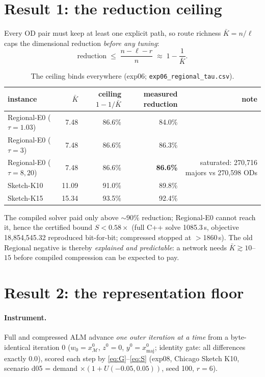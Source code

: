 \documentclass[11pt]{article}
\newcommand{\Kbar}{\bar K}
\begin{document}
\section{Result 1: the reduction ceiling}\label{sec:ceiling}

Every OD pair must keep at least one explicit path, so route richness
$\Kbar=n/\ell$ caps the dimensional reduction \emph{before any tuning}:
\begin{equation}
\text{reduction}\;\le\;\frac{n-\ell-r}{n}\;\approx\;1-\frac{1}{\Kbar}.
\label{eq:ceiling}
\end{equation}

\begin{table}[h]\centering\small
\caption{The ceiling binds everywhere (exp06; \texttt{exp06\_regional\_tau.csv}).}
\begin{tabular}{lrrrr}
\toprule
instance & $\Kbar$ & ceiling $1{-}1/\Kbar$ & measured reduction & note\\
\midrule
Regional-E0 ($\tau{=}1.03$) & 7.48 & 86.6\% & 84.0\% & \\
Regional-E0 ($\tau{=}3$)    & 7.48 & 86.6\% & 86.3\% & \\
Regional-E0 ($\tau{=}8,20$) & 7.48 & 86.6\% & \textbf{86.6\%} & saturated: 270{,}716 majors vs 270{,}598 ODs\\
Sketch-K10 & 11.09 & 91.0\% & 89.8\% & \\
Sketch-K15 & 15.34 & 93.5\% & 92.4\% & \\
\bottomrule
\end{tabular}
\end{table}

\noindent The compiled solver paid only above ${\sim}90\%$ reduction; Regional-E0 cannot
reach it, hence the certified bound $S<0.58\times$ (full C++ solve 1085.3\,s, objective
18{,}854{,}545.32 reproduced bit-for-bit; compressed stopped at $>$1860\,s). The old
Regional negative is thereby \emph{explained and predictable}: a network needs
$\Kbar\gtrsim10$--$15$ before compiled compression can be expected to pay.

\section{Result 2: the representation floor}\label{sec:floor}

\paragraph{Instrument.} Full and compressed ALM advance \emph{one outer iteration at a
time} from a byte-identical iteration 0 ($w_0=x^0_{\mathcal M}$, $z^0=0$,
$y^0=x^0_{\mathrm{maj}}$; identity gate: all differences exactly $0.0$), scored each
step by \eqref{eq:G}--\eqref{eq:S} (exp08, Chicago Sketch K10, scenario d05 = demand
$\times(1+U(-0.05,0.05))$, seed 100, $r=6$).
\end{document}
